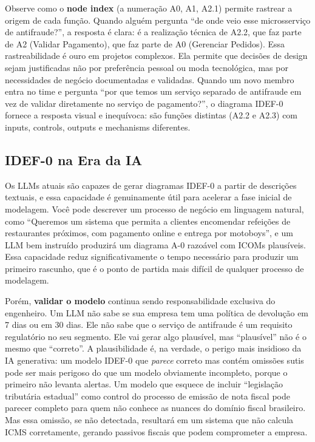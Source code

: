 Observe como o \textbf{node index} (a numeração A0, A1, A2.1) permite
rastrear a origem de cada função. Quando alguém pergunta ``de onde veio esse
microsserviço de antifraude?'', a resposta é clara: é a realização técnica de
A2.2, que faz parte de A2 (Validar Pagamento), que faz parte de A0 (Gerenciar
Pedidos). Essa rastreabilidade é ouro em projetos complexos. Ela permite que
decisões de design sejam justificadas não por preferência pessoal ou moda
tecnológica, mas por necessidades de negócio documentadas e validadas. Quando
um novo membro entra no time e pergunta ``por que temos um serviço separado de
antifraude em vez de validar diretamente no serviço de pagamento?'', o diagrama
IDEF-0 fornece a resposta visual e inequívoca: são funções distintas (A2.2 e
A2.3) com inputs, controls, outputs e mechanisms diferentes.

\subsection{IDEF-0 na Era da IA}

Os LLMs atuais são capazes de gerar diagramas IDEF-0 a partir de descrições
textuais, e essa capacidade é genuinamente útil para acelerar a fase inicial de
modelagem. Você pode descrever um processo de negócio em linguagem natural,
como ``Queremos um sistema que permita a clientes encomendar refeições de restaurantes
próximos, com pagamento online e entrega por motoboys'', e um LLM bem instruído
produzirá um diagrama A-0 razoável com ICOMs plausíveis. Essa capacidade reduz
significativamente o tempo necessário para produzir um primeiro rascunho, que é
o ponto de partida mais difícil de qualquer processo de modelagem.

Porém, \textbf{validar o modelo} continua sendo responsabilidade
exclusiva do engenheiro. Um LLM não sabe se sua empresa tem uma política de
devolução em 7 dias ou em 30 dias. Ele não sabe que o serviço de antifraude é
um requisito regulatório no seu segmento. Ele vai gerar algo plausível, mas
``plausível'' não é o mesmo que ``correto''. A plausibilidade é, na verdade, o
perigo mais insidioso da IA generativa: um modelo IDEF-0 que \emph{parece} correto
mas contém omissões sutis pode ser mais perigoso do que um modelo obviamente
incompleto, porque o primeiro não levanta alertas. Um modelo que esquece de incluir
``legislação tributária estadual'' como control do processo de emissão de nota
fiscal pode parecer completo para quem não conhece as nuances do domínio fiscal
brasileiro. Mas essa omissão, se não detectada, resultará em um sistema que não
calcula ICMS corretamente, gerando passivos fiscais que podem comprometer a empresa.

